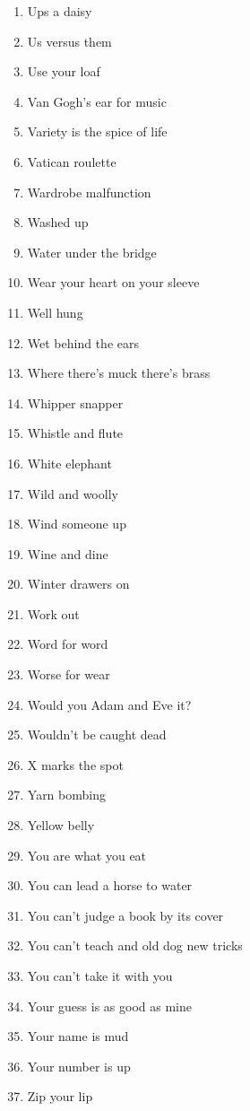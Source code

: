 \begin{enumerate}
        \item  Ups a daisy
        \item  Us versus them
        \item  Use your loaf
        \item  Van Gogh's ear for music
        \item  Variety is the spice of life
        \item  Vatican roulette
        \item  Wardrobe malfunction
        \item  Washed up
        \item  Water under the bridge
        \item  Wear your heart on your sleeve
        \item  Well hung
        \item  Wet behind the ears
        \item  Where there's muck there's brass
        \item  Whipper snapper
        \item  Whistle and flute
        \item  White elephant
        \item  Wild and woolly
        \item  Wind someone up
        \item  Wine and dine
        \item  Winter drawers on
        \item  Work out
        \item  Word for word
        \item  Worse for wear
        \item  Would you Adam and Eve it?
        \item  Wouldn't be caught dead
        \item  X marks the spot
        \item  Yarn bombing
        \item  Yellow belly
        \item  You are what you eat
        \item  You can lead a horse to water
        \item  You can't judge a book by its cover
        \item  You can't teach and old dog new tricks
        \item  You can't take it with you
        \item  Your guess is as good as mine
        \item  Your name is mud
        \item  Your number is up
        \item  Zip your lip
    \end{enumerate}


